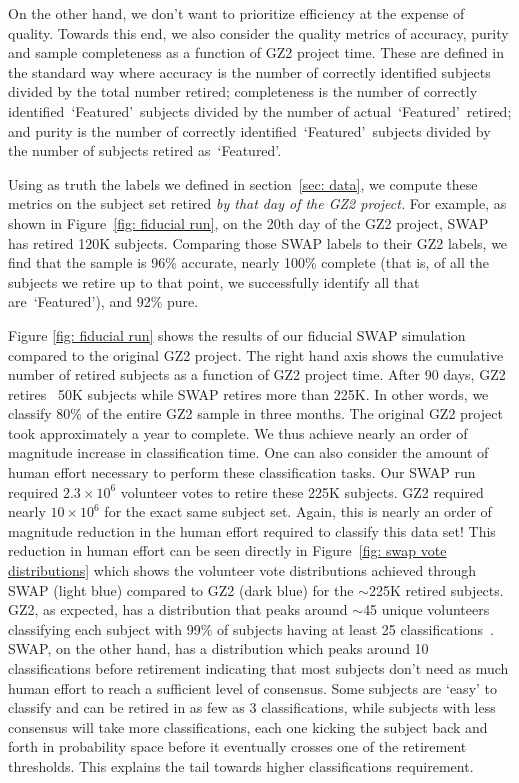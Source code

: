 \documentclass[twocolumn]{aastex6}
\newcommand{\feat}{`Featured'}
\begin{document}
On the other hand, we don't want to prioritize efficiency at the expense of quality. 
Towards this end, we also consider the quality metrics of accuracy, 
purity and sample completeness as a function of GZ2 project time.  These are 
defined in the standard way where accuracy is the number of correctly
identified subjects divided by the total number retired; completeness is the number of 
correctly identified~\feat~subjects divided by the number of actual~\feat~retired; 
and purity is the number of correctly identified~\feat~subjects divided by 
the number of subjects retired as~\feat. 

Using as truth the labels we defined in section~\ref{sec: data}, we compute
these metrics on the subject set retired \textit{by that day of the GZ2 project.} 
For example, as shown in Figure~\ref{fig: fiducial run}, 
on the 20th day of the GZ2 project, 
SWAP has retired 120K subjects. Comparing those SWAP labels to their GZ2 labels, 
we find that the sample is 96\% accurate, nearly 100\% complete (that is, of all
the subjects we retire up to that point, we successfully identify all that are~\feat),
and 92\% pure. 


Figure \ref{fig: fiducial run} shows the results of our fiducial SWAP simulation
compared to the original GZ2 project. The right hand  axis shows the cumulative
number of retired subjects as a function of GZ2 project time. After 90 days, GZ2 
retires ~50K subjects while SWAP retires more than 225K. In other words, we classify 80\% of
the entire GZ2 sample in three months. The original GZ2 project took approximately
a year to complete. We thus achieve nearly an order of magnitude increase in
classification time. One can also consider the amount of human effort necessary to 
perform these classification tasks. Our SWAP run required $2.3 \times 10^6$ volunteer
votes to retire these 225K subjects. GZ2 required nearly $10 \times 10^6$ for the 
exact same subject set. Again, this is nearly an order of magnitude reduction in 
the human effort required to classify this data set! This reduction in human effort 
can be seen directly in Figure~\ref{fig: swap vote distributions} which shows the volunteer 
vote distributions achieved through SWAP (light blue) compared to GZ2 (dark blue)
for the $\sim$225K retired subjects. GZ2, as expected, has a distribution that peaks 
around $\sim$45 unique volunteers classifying each subject with 99\% of subjects 
having at least 25 classifications~\citep{Willett2013}. 
SWAP, on the other hand, has a distribution which peaks around 10 classifications
before retirement indicating that most subjects don't need as much human effort
to reach a sufficient level of consensus. Some subjects are `easy' to classify and can be 
retired in as few as 3 classifications, while subjects with less consensus will 
take more classifications, each one kicking the subject back and forth in probability space
before it eventually crosses one of the retirement thresholds. 
This explains the tail towards higher classifications requirement.
\end{document}
